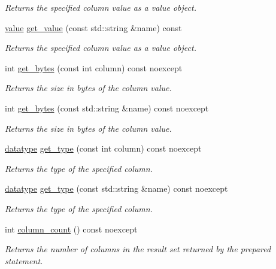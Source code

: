\begin{DoxyCompactItemize}
\begin{DoxyCompactList}\small\item\em Returns the specified column value as a value object. \end{DoxyCompactList}\item 
\hyperlink{a00015}{value} \hyperlink{a00010_ad7835e8a981450975fee7771fa863ffe}{get\-\_\-value} (const std\-::string \&name) const
\begin{DoxyCompactList}\small\item\em Returns the specified column value as a value object. \end{DoxyCompactList}\item 
int \hyperlink{a00010_ac4404227950aca8d5f01255a5541dbb4}{get\-\_\-bytes} (const int column) const noexcept
\begin{DoxyCompactList}\small\item\em Returns the size in bytes of the column value. \end{DoxyCompactList}\item 
int \hyperlink{a00010_a315b97406b5ba48bcd14857192d88d5e}{get\-\_\-bytes} (const std\-::string \&name) const noexcept
\begin{DoxyCompactList}\small\item\em Returns the size in bytes of the column value. \end{DoxyCompactList}\item 
\hyperlink{a00038_a7467e5cdd32bbf7fce35aced88682dc0}{datatype} \hyperlink{a00010_a2b8269e0f9387afa36ab90eb55899dc4}{get\-\_\-type} (const int column) const noexcept
\begin{DoxyCompactList}\small\item\em Returns the type of the specified column. \end{DoxyCompactList}\item 
\hyperlink{a00038_a7467e5cdd32bbf7fce35aced88682dc0}{datatype} \hyperlink{a00010_ac5ab606cf12aa4d2c9a183998420df44}{get\-\_\-type} (const std\-::string \&name) const noexcept
\begin{DoxyCompactList}\small\item\em Returns the type of the specified column. \end{DoxyCompactList}\item 
int \hyperlink{a00010_a7390afddbb1edc788f0afc6ce41f4562}{column\-\_\-count} () const noexcept
\begin{DoxyCompactList}\small\item\em Returns the number of columns in the result set returned by the prepared statement. \end{DoxyCompactList}\item 

\end{DoxyCompactItemize}
